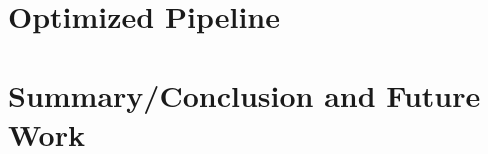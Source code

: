 \documentclass[11pt]{article}
\begin{document}

\section{Optimized Pipeline}
\label{sec:pipeline}

\section{Summary/Conclusion and Future Work}
\label{sec:summary}




\end{document}
